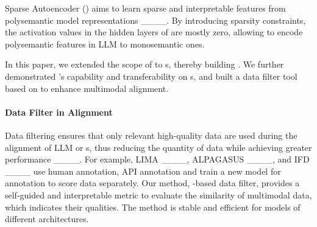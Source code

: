 Sparse Autoencoder (\old{}) aims to learn sparse and interpretable features from polysemantic model representations ____. By introducing sparsity constraints, the activation values in the hidden layers of \old{} are mostly zero, allowing \old{} to encode polysemantic features in LLM to monosemantic ones. 

In this paper, we extended the scope of \old{} to \model{}s, thereby building \ours{}. We further demonstrated \ours{}'s capability and transferability on \model{}s, and built a data filter tool based on \ours{} to enhance multimodal alignment.

\paragraph{Data Filter in Alignment}

Data filtering ensures that only relevant high-quality data are used during the alignment of LLM or \model{} s, thus reducing the quantity of data while achieving greater performance ____. For example, LIMA ____, ALPAGASUS ____, and IFD ____ use human annotation, API annotation and train a new model for annotation to score data separately. Our method, \ours{}-based data filter, provides a self-guided and interpretable metric to evaluate the similarity of multimodal data, which indicates their qualities. The method is stable and efficient for models of different architectures.




